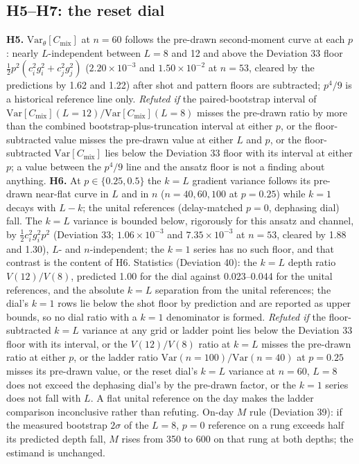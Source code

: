 \documentclass[aps,prxquantum,reprint,superscriptaddress,nofootinbib,longbibliography,amsmath,amssymb]{revtex4-2}
\newcommand{\Var}{\mathrm{Var}}
\newcommand{\Cmix}{C_{\mathrm{mix}}}
\begin{document}
\subsection{H5--H7: the reset dial}
\textbf{H5.} $\Var_\theta[\Cmix]$ at $n = 60$ follows the pre-drawn second-moment curve at each $p$: nearly $L$-independent between $L = 8$ and 12 and above the Deviation 33 floor $\tfrac12 p^2(c_i^2 g_i^2 + c_j^2 g_j^2)$ ($2.20\times10^{-3}$ and $1.50\times10^{-2}$ at $n = 53$, cleared by the predictions by 1.62 and 1.22) after shot and pattern floors are subtracted; $p^4/9$ is a historical reference line only. \emph{Refuted if} the paired-bootstrap interval of $\Var[\Cmix](L{=}12)/\Var[\Cmix](L{=}8)$ misses the pre-drawn ratio by more than the combined bootstrap-plus-truncation interval at either $p$, or the floor-subtracted value misses the pre-drawn value at either $L$ and $p$, or the floor-subtracted $\Var[\Cmix]$ lies below the Deviation 33 floor with its interval at either $p$; a value between the $p^4/9$ line and the ansatz floor is not a finding about anything.
\textbf{H6.} At $p \in \{0.25, 0.5\}$ the $k = L$ gradient variance follows its pre-drawn near-flat curve in $L$ and in $n$ ($n = 40, 60, 100$ at $p = 0.25$) while $k = 1$ decays with $L - k$; the unital references (delay-matched $p = 0$, dephasing dial) fall. The $k = L$ variance is bounded below, rigorously for this ansatz and channel, by $\tfrac12 c_i^2 g_i^2 p^2$ (Deviation 33; $1.06\times10^{-3}$ and $7.35\times10^{-3}$ at $n = 53$, cleared by 1.88 and 1.30), $L$- and $n$-independent; the $k = 1$ series has no such floor, and that contrast is the content of H6. Statistics (Deviation 40): the $k = L$ depth ratio $V(12)/V(8)$, predicted 1.00 for the dial against 0.023--0.044 for the unital references, and the absolute $k = L$ separation from the unital references; the dial's $k = 1$ rows lie below the shot floor by prediction and are reported as upper bounds, so no dial ratio with a $k = 1$ denominator is formed. \emph{Refuted if} the floor-subtracted $k = L$ variance at any grid or ladder point lies below the Deviation 33 floor with its interval, or the $V(12)/V(8)$ ratio at $k = L$ misses the pre-drawn ratio at either $p$, or the ladder ratio $\Var(n{=}100)/\Var(n{=}40)$ at $p = 0.25$ misses its pre-drawn value, or the reset dial's $k = L$ variance at $n = 60$, $L = 8$ does not exceed the dephasing dial's by the pre-drawn factor, or the $k = 1$ series does not fall with $L$. A flat unital reference on the day makes the ladder comparison inconclusive rather than refuting. On-day $M$ rule (Deviation 39): if the measured bootstrap $2\sigma$ of the $L = 8$, $p = 0$ reference on a rung exceeds half its predicted depth fall, $M$ rises from 350 to 600 on that rung at both depths; the estimand is unchanged.
\end{document}
